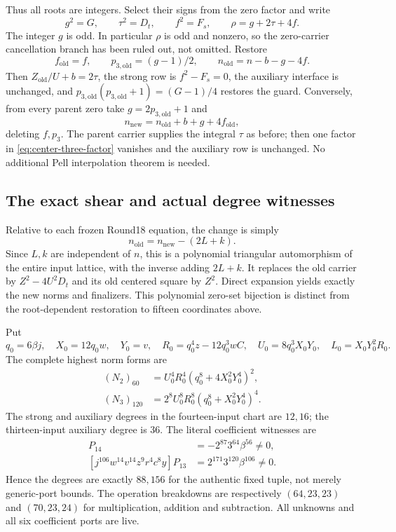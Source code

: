 Thus all roots are integers. Select their signs from the zero factor and write
\[
 g^2=G,\qquad\tau^2=D_t,\qquad f^2=F_s,
 \qquad\rho=g+2\tau+4f.
\]
The integer $g$ is odd. In particular $\rho$ is odd and nonzero, so the
zero-carrier cancellation branch has been ruled out, not omitted. Restore
\[
 f_{\mathrm{old}}=f,\qquad p_{3,\mathrm{old}}=(g-1)/2,
 \qquad n_{\mathrm{old}}=n-b-g-4f.
\]
Then $Z_{\mathrm{old}}/U+b=2\tau$, the strong row is $f^2-F_s=0$,
the auxiliary interface is unchanged, and
$p_{3,\mathrm{old}}(p_{3,\mathrm{old}}+1)=(G-1)/4$ restores the guard.
Conversely, from every parent zero take $g=2p_{3,\mathrm{old}}+1$ and
\[
 n_{\mathrm{new}}=n_{\mathrm{old}}+b+g+4f_{\mathrm{old}},
\]
deleting $f,p_3$. The parent carrier supplies the integral $\tau$ as before;
then one factor in \eqref{eq:center-three-factor} vanishes and the auxiliary
row is unchanged. No additional Pell interpolation theorem is needed.

\subsection{The exact shear and actual degree witnesses}
Relative to each frozen Round18 equation, the change is simply
\[
 n_{\mathrm{old}}=n_{\mathrm{new}}-(2L+k).
\]
Since $L,k$ are independent of $n$, this is a polynomial triangular
automorphism of the entire input lattice, with the inverse adding $2L+k$.
It replaces the old carrier by $Z^2-4U^2D_t$ and its old centered square by
$Z^2$. Direct expansion yields exactly the new norms and finalizers.
This polynomial zero-set bijection is distinct from the root-dependent
restoration to fifteen coordinates above.

Put
\[
 q_0=6\beta j,\quad X_0=12q_0w,\quad Y_0=v,\quad
 R_0=q_0^4z-12q_0^3wC,\quad
 U_0=8q_0^3X_0Y_0,\quad L_0=X_0Y_0^2R_0.
\]
The complete highest norm forms are
\begin{align*}
 (N_2)_{60}&=U_0^4R_0^4(q_0^8+4X_0^2Y_0^4)^2,\\
 (N_3)_{120}&=2^8U_0^8R_0^8(q_0^8+X_0^2Y_0^4)^4.
\end{align*}
The strong and auxiliary degrees in the fourteen-input chart are $12,16$;
the thirteen-input auxiliary degree is $36$. The literal coefficient
witnesses are
\begin{align*}
 [j^{56}w^8v^8z^5r^2c^4f^4y]P_{14}
   &=-2^{87}3^{64}\beta^{56}\ne0,\\
 [j^{106}w^{14}v^{14}z^9r^4c^8y]P_{13}
   &=2^{171}3^{120}\beta^{106}\ne0.
\end{align*}
Hence the degrees are exactly $88,156$ for the authentic fixed tuple, not
merely generic-port bounds. The operation breakdowns are respectively
$(64,23,23)$ and $(70,23,24)$ for multiplication, addition and subtraction.
All unknowns and all six coefficient ports are live.

